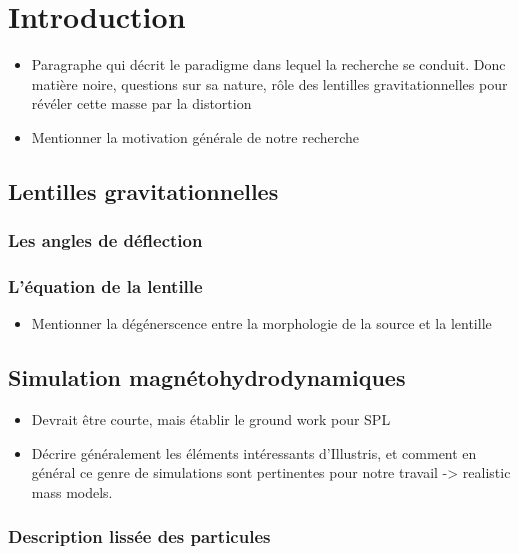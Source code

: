 \chapter{Introduction}
\thispagestyle{empty}
\begin{itemize}
        \item Paragraphe qui décrit le paradigme dans lequel la recherche se conduit. 
                Donc matière noire, questions sur sa nature, rôle des 
                lentilles gravitationnelles pour révéler cette masse par la distortion
        \item Mentionner la motivation générale de notre recherche
        
\end{itemize}

\section{Lentilles gravitationnelles}
\subsection{Les angles de déflection}
\subsection{L'équation de la lentille}
\begin{itemize}
        \item Mentionner la dégénerscence entre la morphologie de la source et la 
                lentille
\end{itemize}

\section{Simulation magnétohydrodynamiques}
\begin{itemize}
        \item Devrait être courte, mais établir le ground work pour 
                SPL
        \item Décrire généralement les éléments intéressants d'Illustris, et
                comment en général ce genre de simulations sont pertinentes 
                pour notre travail -> realistic mass models.
\end{itemize}
\subsection{Description lissée des particules}

